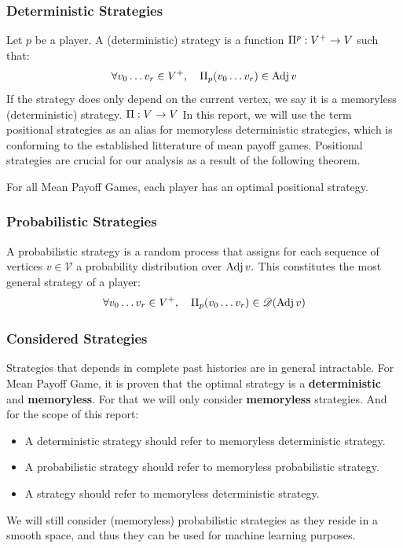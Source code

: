 \subsubsection{Deterministic Strategies}
\label{section:Formalisation:Strategy:Deterministic}
\label{section:Formalisation:Strategy:Positional}
Let $p$ be a player. \newline 
A (deterministic) strategy is a function $\Pi^{p}:V^+\rightarrow V$ such that:
$$
\forall v_0\dots v_r\in V^+, \quad \Pi_p(v_0\dots v_r) \in \operatorname{Adj} v
$$	
If the strategy does only depend on the current vertex, we say it is a memoryless (deterministic) strategy.  $\Pi:V\rightarrow V$
\newline In this report, we will use the term positional strategies as an alias for memoryless deterministic strategies, which is conforming to the established litterature of mean payoff games.
\newline Positional strategies are crucial for our analysis as a result of the following theorem.
\begin{theorem}
	\label{theorem:OptimalStrategy}
	For all Mean Payoff Games, each player has an optimal positional strategy.
\end{theorem}

\subsubsection{Probabilistic Strategies}
A probabilistic strategy is a random process that assigns for each sequence of vertices $v\in\mathcal{V}$ a probability distribution over $\operatorname{Adj} v.$ This constitutes the most general strategy of a player:
$$
\forall v_0\dots v_r\in V^+, \quad \Pi_p(v_0\dots v_r) \in \mathscr{D}(\operatorname{Adj} v)
$$
\subsubsection{Considered Strategies}
Strategies that depends in complete past histories are in general intractable. For Mean Payoff Game, it is proven that the optimal strategy is a \textbf{deterministic} and \textbf{memoryless}.
\newline For that we will only consider \textbf{memoryless} strategies. And for the scope of this report:
\begin{itemize}
	\item A deterministic strategy should refer to memoryless deterministic strategy.
	\item A probabilistic strategy should refer to memoryless probabilistic strategy.
	\item A strategy should refer to memoryless deterministic strategy.
\end{itemize}
We will still consider (memoryless) probabilistic strategies as they reside in a smooth space, and thus they can be used for machine learning purposes.
